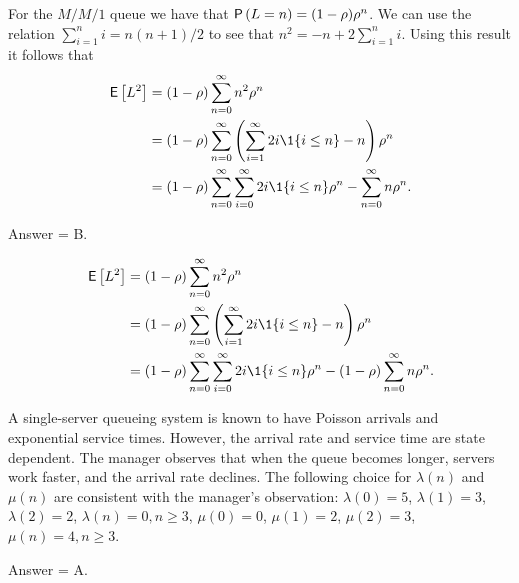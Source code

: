 \begin{exercise}[201903]
  For the $M/M/1$ queue we have that $\P{L=n} = (1-\rho)\rho^n$.  We can use the relation 
  $\sum_{i=1}^n i= n(n+1)/2$ to see  that $n^2 = -n + 2\sum_{i=1}^n i$. Using this result it follows that
\begin{equation*}
\begin{split}
\E{L^2} &=  
    (1-\rho)\sum_{n=0}^\infty n^2 \rho^n  \\
&=    (1-\rho) \sum_{n=0}^\infty \left(\sum_{i=1}^\infty 2i \1{i\leq n}  - n\right)\rho^n \\
&=    (1-\rho) \sum_{n=0}^\infty \sum_{i=0}^\infty 2i\1{i\leq n}\rho^n  - \sum_{n=0}^\infty n\rho^n. 
\end{split}
\end{equation*}

\begin{solution}
Answer = B.

\begin{equation*}
\begin{split}
\E{L^2} &=  
    (1-\rho)\sum_{n=0}^\infty n^2 \rho^n \\
&=    (1-\rho) \sum_{n=0}^\infty \left(\sum_{i=1}^\infty 2i \1{i\leq n}  - n\right)\rho^n \\
&=    (1-\rho) \sum_{n=0}^\infty \sum_{i=0}^\infty 2i\1{i\leq n}\rho^n  - (1-\rho) \sum_{n=0}^\infty n\rho^n. 
\end{split}
\end{equation*}



\end{solution}
\end{exercise}

\begin{exercise}[201903]
 A single-server queueing system is known to have Poisson
  arrivals and exponential service times. However, the arrival rate
  and service time are state dependent. The manager observes that when the queue becomes longer,
  servers work faster, and the arrival rate declines. The following choice for $\lambda(n)$ and $\mu(n)$ are consistent with the manager's observation:
  $\lambda(0) = 5$, $\lambda(1)=3$, $\lambda(2)=2$,
  $\lambda(n)=0, n\geq 3$, $\mu(0) = 0$, $\mu(1)=2$, $\mu(2)=3$, $\mu(n)=4, n\geq 3$. 

\begin{solution}
Answer = A.
\end{solution}
\end{exercise}

